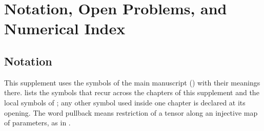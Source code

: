 \chapter{Notation, Open Problems, and Numerical Index}
\label{app:gaussian-backmatter}

\section{Notation}

This supplement uses the symbols of the main manuscript () with their meanings
there.  lists the symbols that recur across the chapters of this
supplement and the local symbols of ; any other symbol used inside one
chapter is declared at its opening. The word pullback means
restriction of a tensor along an injective map of parameters, as in
.

